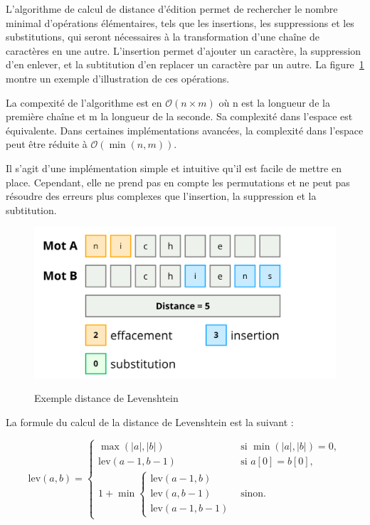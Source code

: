 \documentclass[a4paper, 11pt]{report}
\begin{document}
L'algorithme de calcul de distance d'édition permet de rechercher le nombre minimal d'opérations élémentaires, tels que les insertions, les suppressions et les substitutions, qui seront nécessaires à la transformation d'une chaîne de caractères en une autre. L'insertion permet d'ajouter un caractère, la suppression d'en enlever, et la subtitution d'en replacer un caractère par un autre. La figure~\ref{fig:levenshtein} montre un exemple d'illustration de ces opérations. \par \vspace{\baselineskip}

La compexité de l'algorithme est en $\mathcal{O}(n \times m)$  où n est la longueur de la première chaîne et m la longueur de la seconde. Sa complexité dans l'espace est équivalente. Dans certaines implémentations avancées, la complexité dans l'espace peut être réduite à $\mathcal{O}(\min(n,m))$. \par \vspace{\baselineskip}

Il s'agit d'une implémentation simple et intuitive qu'il est facile de mettre en place. Cependant, elle ne prend pas en compte les permutations et ne peut pas résoudre des erreurs plus complexes que l'insertion, la suppression et la subtitution.


\begin{figure}[H]
	\begin{center}
		{\includegraphics[height=0.45\textwidth]{images/levenshtein.png}}
	\end{center}
	\caption{Exemple distance de Levenshtein}
	\label{fig:levenshtein}
\end{figure}

\noindent{}La formule du calcul de la distance de Levenshtein est la suivant :

\[
	\text{lev}(a, b) =
	\begin{cases}
		\max(|a|, |b|)           & \text{si } \min(|a|, |b|) = 0, \\
		\text{lev}(a - 1, b - 1) & \text{si } a[0] = b[0],        \\
		1 + \min \begin{cases}
			         \text{lev}(a - 1, b) \\
			         \text{lev}(a, b - 1) \\
			         \text{lev}(a - 1, b - 1)
		         \end{cases} & \text{sinon}.
	\end{cases}
\]
\end{document}
